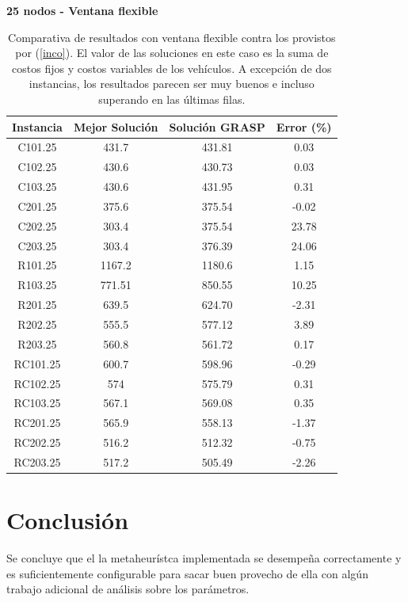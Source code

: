 \documentclass{article}
\begin{document}
  \begin{table}[h!]
    \centering
    \caption*{{\bf 25 nodos - Ventana flexible}}
    \begin{tabular}{cccc}
      \toprule
      Instancia & Mejor Solución & Solución GRASP & Error (\%) \\
      \midrule
      C101.25  &  431.7	 & 431.81 &	0.03  \\
      C102.25  &  430.6	 & 430.73 &	0.03 \\
      C103.25  &  430.6	 & 431.95 &	0.31 \\
      C201.25  &  375.6	 & 375.54 &	-0.02 \\
      C202.25  &  303.4	 & 375.54 &	23.78 \\
      C203.25  &  303.4	 & 376.39 &	24.06 \\
      R101.25  &  1167.2 & 1180.6 &  1.15 \\
      R103.25  &  771.51 & 850.55 &	10.25 \\
      R201.25  &  639.5	 & 624.70 &	-2.31 \\
      R202.25  &  555.5	 & 577.12 &	3.89 \\
      R203.25  &  560.8	 & 561.72 &	0.17 \\
      RC101.25 &  600.7	 & 598.96 &	-0.29 \\
      RC102.25 &  574	   & 575.79 &	0.31 \\
      RC103.25 &  567.1	 & 569.08 &	0.35 \\
      RC201.25 &  565.9	 & 558.13 &	-1.37 \\
      RC202.25 &  516.2	 & 512.32 &	-0.75 \\
      RC203.25 &  517.2	 & 505.49 &	-2.26 \\
      \bottomrule
    \end{tabular}
    \caption{Comparativa de resultados con ventana flexible contra los provistos por (\ref{inco}). El valor de las soluciones en este caso es la suma de costos fijos y costos variables de los vehículos. A excepción de dos instancias, los resultados parecen ser muy buenos e incluso superando en las últimas filas.}\label{table:res25nodesflexible}
  \end{table}

  \section*{Conclusión}

  Se concluye que el la metaheurístca implementada se desempeña correctamente y es suficientemente configurable para sacar buen provecho de ella con algún trabajo adicional de análisis sobre los parámetros.
\end{document}
